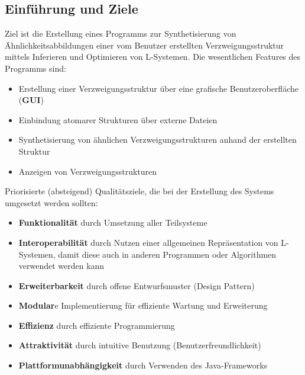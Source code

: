 \documentclass[11pt]{article}
\begin{document}
    \subsection{Einführung und Ziele}
    Ziel ist die Erstellung eines Programms zur Synthetisierung von Ähnlichkeitsabbildungen einer vom Benutzer
    erstellten Verzweigungsstruktur mittels Inferieren und Optimieren von L-Systemen.
    Die wesentlichen Features des Programms sind:
    \begin{itemize}
        \item Erstellung einer Verzweigungsstruktur über eine grafische Benutzeroberfläche (\textbf{GUI})
        \item Einbindung atomarer Strukturen über externe Dateien
        \item Synthetisierung von ähnlichen Verzweigungsstrukturen anhand der erstellten Struktur
        \item Anzeigen von Verzweigungsstrukturen
    \end{itemize}
    Priorisierte (absteigend) Qualitätsziele, die bei der Erstellung des Systems umgesetzt werden sollten:
    \begin{itemize}
        \item \textbf{Funktionalität} durch Umsetzung aller Teilsysteme
        \item \textbf{Interoperabilität} durch Nutzen einer allgemeinen Repräsentation von L-Systemen, damit diese
        auch in anderen Programmen oder Algorithmen verwendet werden kann
        \item \textbf{Erweiterbarkeit} durch offene Entwurfsmuster (Design Pattern)
        \item \textbf{Modular}e Implementierung für effiziente Wartung und Erweiterung
        \item \textbf{Effizienz} durch effiziente Programmierung
        \item \textbf{Attraktivität} durch intuitive Benutzung (Benutzerfreundlichkeit)
        \item \textbf{Plattformunabhängigkeit} durch Verwenden des Java-Frameworks
    \end{itemize}
\end{document}
